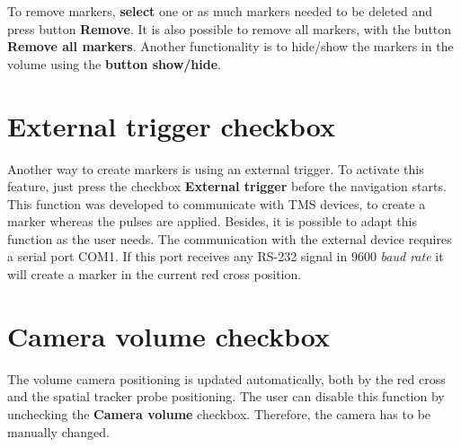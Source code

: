 To remove markers, \textbf{select} one or as much markers needed to be deleted and press button \textbf{Remove}.
It is also possible to remove all markers, with the button \textbf{Remove all markers}. Another functionality
is to hide/show the markers in the volume using the \textbf{button show/hide}.


\section{External trigger checkbox}

Another way to create markers is using an external trigger. To activate this feature, just press the
checkbox \textbf{External trigger} before the navigation starts. This function was developed to communicate with
TMS devices, to create a marker whereas the pulses are applied. Besides, it is possible to adapt this function as
the user needs. The communication with the external device requires a serial port COM1. If this port receives
any RS-232 signal in 9600 \textit{baud rate} it will create a marker in the current red cross position.

\section{Camera volume checkbox}

The volume camera positioning is updated automatically, both by the red cross and the spatial tracker probe positioning.
The user can disable this function by unchecking the \textbf{Camera volume} checkbox.
Therefore, the camera has to be manually changed.
